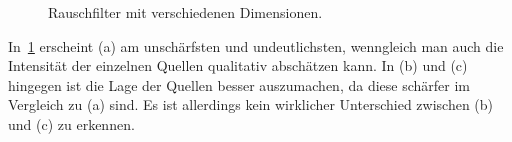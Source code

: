 \documentclass[slug=PET, room=Andreas-Schubert-Bau\,\ 424A, supervisor=Carsten\ Bittrich, coursedate=10.\ 01.\ 2020]{../../Lab_Report_LaTeX/lab_report}
\begin{document}
\begin{figure}[h!]
	\centering
	\caption{Rauschfilter mit verschiedenen Dimensionen.}
	\label{fig:rausch}
\end{figure}

In~\ref{fig:rausch} erscheint (a) am unschärfsten und undeutlichsten, wenngleich man auch die 
Intensität der einzelnen Quellen qualitativ abschätzen kann. In (b) und (c) hingegen ist die
Lage der Quellen besser auszumachen, da diese schärfer im Vergleich zu (a) sind. Es ist allerdings
kein wirklicher Unterschied zwischen (b) und (c) zu erkennen.

\end{document}
